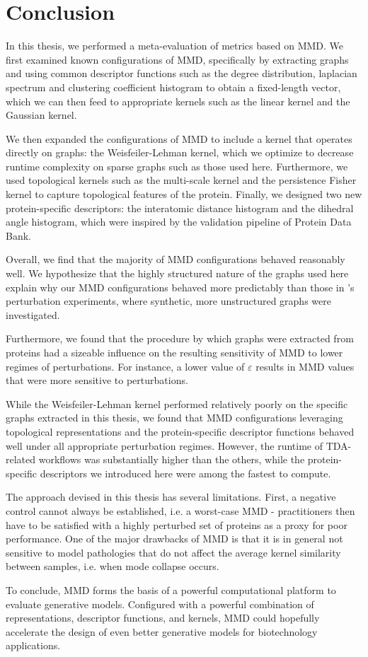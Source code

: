 \chapter{Conclusion}\label{chap:conclusion}

In this thesis, we performed a meta-evaluation of metrics based on MMD. We first
examined known configurations of MMD, specifically by extracting graphs and
using common descriptor functions such as the degree distribution, laplacian
spectrum and clustering coefficient histogram to obtain a fixed-length vector,
which we can then feed to appropriate kernels such as the linear kernel and the
Gaussian kernel.

We then expanded the configurations of MMD to include a kernel that operates
directly on graphs: the Weisfeiler-Lehman kernel, which we optimize to decrease
runtime complexity on sparse graphs such as those used here. Furthermore, we
used topological kernels such as the multi-scale kernel and the persistence
Fisher kernel to capture topological features of the protein. Finally, we
designed two new protein-specific descriptors: the interatomic distance
histogram and the dihedral angle histogram, which were inspired by the
validation pipeline of Protein Data Bank.

Overall, we find that the majority of MMD configurations behaved reasonably
well. We hypothesize that the highly structured nature of the graphs used here
explain why our MMD configurations behaved more predictably than those
in \cite{o2021evaluation}'s perturbation experiments, where synthetic, more
unstructured graphs were investigated.

Furthermore, we found that the procedure by which graphs were extracted from
proteins had a sizeable influence on the resulting sensitivity of MMD to lower
regimes of perturbations. For instance, a lower value of $\varepsilon$ results
in MMD values that were more sensitive to perturbations.

While the Weisfeiler-Lehman kernel performed relatively poorly on the specific
graphs extracted in this thesis, we found that MMD configurations leveraging
topological representations and the protein-specific descriptor functions
behaved well under all appropriate perturbation regimes. However, the runtime of
TDA-related workflows was substantially higher than the others, while the
protein-specific descriptors we introduced here were among the fastest to
compute.

The approach devised in this thesis has several limitations. First, a negative
control cannot always be established, i.e. a worst-case MMD - practitioners then
have to be satisfied with a highly perturbed set of proteins as a proxy for poor
performance. One of the major drawbacks of MMD is that it is in general not
sensitive to model pathologies that do not affect the average kernel similarity
between samples, i.e. when mode collapse occurs.

To conclude, MMD forms the basis of a powerful computational platform to
evaluate generative models. Configured with a powerful combination of
representations, descriptor functions, and kernels, MMD could hopefully
accelerate the design of even better generative models for biotechnology
applications.
